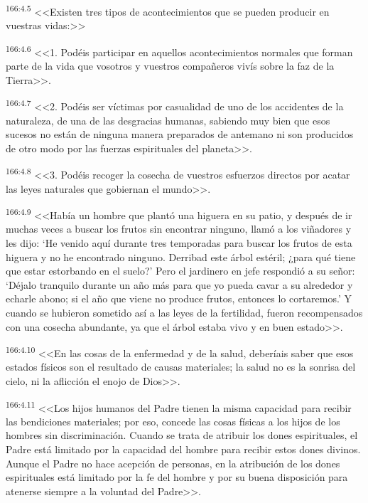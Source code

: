 \par 
\textsuperscript{166:4.5} <<Existen tres tipos de acontecimientos que se pueden producir en vuestras vidas:>>

\par 
\textsuperscript{166:4.6} <<1. Podéis participar en aquellos acontecimientos normales que forman parte de la vida que vosotros y vuestros compañeros vivís sobre la faz de la Tierra>>.

\par 
\textsuperscript{166:4.7} <<2. Podéis ser víctimas por casualidad de uno de los accidentes de la naturaleza, de una de las desgracias humanas, sabiendo muy bien que esos sucesos no están de ninguna manera preparados de antemano ni son producidos de otro modo por las fuerzas espirituales del planeta>>.

\par 
\textsuperscript{166:4.8} <<3. Podéis recoger la cosecha de vuestros esfuerzos directos por acatar las leyes naturales que gobiernan el mundo>>.

\par 
\textsuperscript{166:4.9} <<Había un hombre que plantó una higuera en su patio, y después de ir muchas veces a buscar los frutos sin encontrar ninguno, llamó a los viñadores y les dijo: `He venido aquí durante tres temporadas para buscar los frutos de esta higuera y no he encontrado ninguno. Derribad este árbol estéril; ¿para qué tiene que estar estorbando en el suelo?' Pero el jardinero en jefe respondió a su señor: `Déjalo tranquilo durante un año más para que yo pueda cavar a su alrededor y echarle abono; si el año que viene no produce frutos, entonces lo cortaremos.' Y cuando se hubieron sometido así a las leyes de la fertilidad, fueron recompensados con una cosecha abundante, ya que el árbol estaba vivo y en buen estado>>.

\par 
\textsuperscript{166:4.10} <<En las cosas de la enfermedad y de la salud, deberíais saber que esos estados físicos son el resultado de causas materiales; la salud no es la sonrisa del cielo, ni la aflicción el enojo de Dios>>.

\par 
\textsuperscript{166:4.11} <<Los hijos humanos del Padre tienen la misma capacidad para recibir las bendiciones materiales; por eso, concede las cosas físicas a los hijos de los hombres sin discriminación. Cuando se trata de atribuir los dones espirituales, el Padre está limitado por la capacidad del hombre para recibir estos dones divinos. Aunque el Padre no hace acepción de personas, en la atribución de los dones espirituales está limitado por la fe del hombre y por su buena disposición para atenerse siempre a la voluntad del Padre>>.

